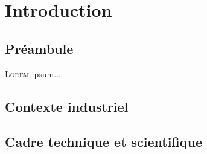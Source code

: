 

\graphicspath{{5_Images/0_Introduction/}}                       %
\makeatletter
{}                     %
\makeatother


\chapter*{Introduction}\label{Chap:Introduction}                %

\mtcaddchapter%
{}                    %



\section*{Préambule}

\lettrine{L}{orem} ipsum...

\lipsum[1-3]%

\section*{Contexte industriel}

\lipsum[1-3]%

\section*{Cadre technique et scientifique}

\lipsum[1-3]%
